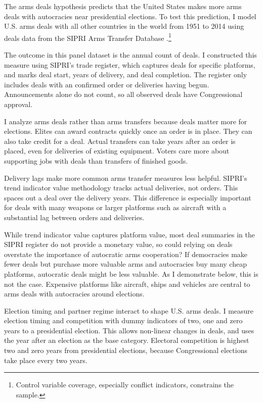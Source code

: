 \documentclass[12pt]{article}
\begin{document}
The arms deals hypothesis predicts that the United States makes more arms deals with autocracies near presidential elections.
To test this prediction, I model U.S. arms deals with all other countries in the world from 1951 to 2014 using deals data from the SIPRI Arms Transfer Database \citep{SIPRI2021}.\footnote{Control variable coverage, especially conflict indicators, constrains the sample.}


The outcome in this panel dataset is the annual count of deals.
I constructed this measure using SIPRI's trade register, which captures deals for specific platforms, and marks deal start, years of delivery, and deal completion.
The register only includes deals with an confirmed order or deliveries having begun. 
Announcements alone do not count, so all observed deals have Congressional approval.


I analyze arms deals rather than arms transfers because deals matter more for elections. 
Elites can award contracts quickly once an order is in place.
They can also take credit for a deal. 
Actual transfers can take years after an order is placed, even for deliveries of existing equipment. 
Voters care more about supporting jobs with deals than transfers of finished goods. 


Delivery lags make more common arms transfer measures less helpful.
SIPRI's trend indicator value methodology tracks actual deliveries, not orders.
This spaces out a deal over the delivery years. 
This difference is especially important for deals with many weapons or larger platforms such as aircraft with a substantial lag between orders and deliveries. 


While trend indicator value captures platform value, most deal summaries in the SIPRI register do not provide a monetary value, so could relying on deals overstate the importance of autocratic arms cooperation? 
If democracies make fewer deals but purchase more valuable arms and autocracies buy many cheap platforms, autocratic deals might be less valuable. 
As I demonstrate below, this is not the case. 
Expensive platforms like aircraft, ships and vehicles are central to arms deals with autocracies around elections. 


Election timing and partner regime interact to shape U.S. arms deals. 
I measure election timing and competition with dummy indicators of two, one and zero years to a presidential election. 
This allows non-linear changes in deals, and uses the year after an election as the base category. 
Electoral competition is highest two and zero years from presidential elections, because Congressional elections take place every two years. 
\end{document}
